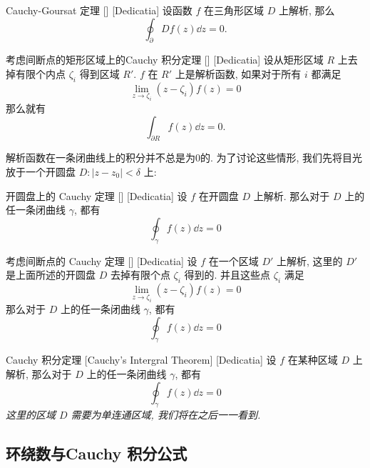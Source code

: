         \begin{thm}
            {Cauchy-Goursat 定理}
            []
            [Dedicatia]
            设函数 \(f\) 在三角形区域 \(D\) 上解析, 那么
            \[\oint_\partial D f(z)\dd{z}=0.\]
        \end{thm}

        \begin{thm}
            {考虑间断点的矩形区域上的Cauchy 积分定理}
            []
            [Dedicatia]
            设从矩形区域 \(R\) 上去掉有限个内点 \(\zeta_i\) 得到区域 \(R'\).  \(f\) 在 \(R'\) 上是解析函数, 如果对于所有 \(i\) 都满足
            \[\lim_{z\to\zeta_i }(z-\zeta_i)f(z)=0\]
            那么就有
            \[\int_{\partial R}f(z)\dd{z}=0.\]
        \end{thm}

        解析函数在一条闭曲线上的积分并不总是为0的. 为了讨论这些情形, 我们先将目光放于一个开圆盘 \(D: |z-z_0|<\delta \) 上:

        \begin{thm}
            {开圆盘上的 Cauchy 定理}
            []
            [Dedicatia]
            设 \(f\) 在开圆盘 \(D\) 上解析. 那么对于 \(D\) 上的任一条闭曲线 \(\gamma\), 都有
            \[\oint_\gamma f(z)\dd{z}=0\]
        \end{thm}
        
        \begin{thm}
            {考虑间断点的 Cauchy 定理}
            []
            [Dedicatia]
            设 \(f\) 在一个区域 \(D'\) 上解析, 这里的 \(D'\) 是上面所述的开圆盘 \(D\) 去掉有限个点 \(\zeta_i\) 得到的. 并且这些点 \(\zeta_i\) 满足
            \[\lim_{z\to\zeta_i }(z-\zeta_i)f(z)=0\]
            那么对于 \(D\) 上的任一条闭曲线 \(\gamma\), 都有
            \[\oint_\gamma f(z)\dd{z}=0\]
        \end{thm}
        
        \begin{thm}
            [Cauchy]
            {Cauchy 积分定理}
            [Cauchy's Intergral Theorem]
            [Dedicatia]
            设 \(f\) 在某种区域 \(D\) 上解析, 那么对于 \(D\) 上的任一条闭曲线 \(\gamma\), 都有
            \[\oint_\gamma f(z)\dd{z}=0\]
            \textit{这里的区域 \(D\) 需要为单连通区域, 我们将在之后一一看到. }
        \end{thm}

    \subsection{环绕数与Cauchy 积分公式}

